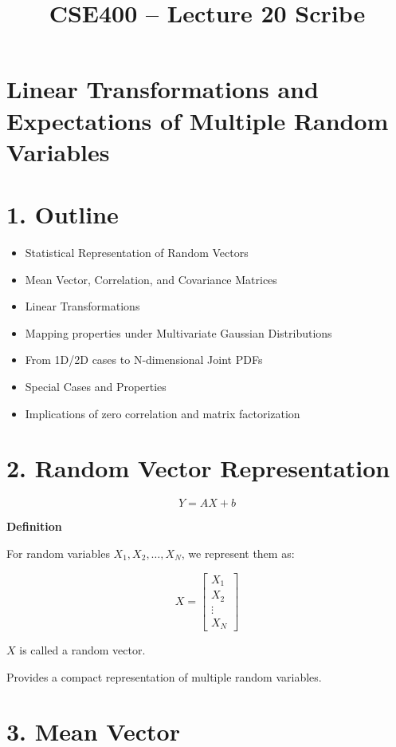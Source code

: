 \documentclass[12pt]{article}
\title{CSE400 -- Lecture 20 Scribe}
\author{}
\date{}
\begin{document}
\maketitle

\section*{Linear Transformations and Expectations of Multiple Random Variables}

\section*{1. Outline}
\begin{itemize}
\item Statistical Representation of Random Vectors
\item Mean Vector, Correlation, and Covariance Matrices
\item Linear Transformations
\item Mapping properties under Multivariate Gaussian Distributions
\item From 1D/2D cases to N-dimensional Joint PDFs
\item Special Cases and Properties
\item Implications of zero correlation and matrix factorization
\end{itemize}

\section*{2. Random Vector Representation}

\[
Y = AX + b
\]

\textbf{Definition}

For random variables $X_1, X_2, \dots, X_N$, we represent them as:

\[
X =
\begin{bmatrix}
X_1 \\
X_2 \\
\vdots \\
X_N
\end{bmatrix}
\]

$X$ is called a random vector.

Provides a compact representation of multiple random variables.

\section*{3. Mean Vector}
\end{document}
